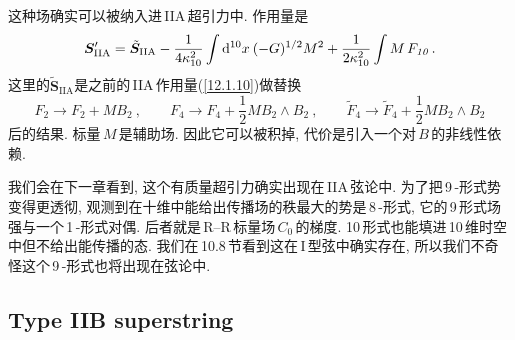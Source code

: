 这种场确实可以被纳入进\,IIA\,超引力中. 作用量是
\begin{equation}
    \bm{S}_{\text{IIA}}^{\prime}=\tilde{\bm{S}}_{\text{IIA}}-\frac{1}{4\kappa_{10}^{2}}\int\mathrm{d}^{10}x\: (-G)^{1/2}M^{2}+\frac{1}{2\kappa_{10}^{2}}\int M\,F_{\textit{10}}\:. \label{12.1.24}
\end{equation}
这里的$\tilde{\bm{S}}_{\text{IIA}}$是之前的\,IIA\,作用量(\ref{12.1.10})做替换
\begin{equation}
    F_{\textit{2}}\to F_{\textit{2}}+MB_{\textit{2}}\:, \qquad 
    F_{\textit{4}}\to F_{\textit{4}}+\frac{1}{2}MB_{\textit{2}}\wedge B_{\textit{2}}\:,\qquad \tilde{F}_{\textit{4}}\to\tilde{F}_{\textit{4}}+\frac{1}{2}MB_{\textit{2}}\wedge B_\textit{2} \label{12.1.25}
\end{equation}
后的结果. 标量$\,M\,$是辅助场. 因此它可以被积掉, 代价是引入一个对$\,B\,$的非线性依赖.

我们会在下一章看到, 这个有质量超引力确实出现在\,IIA\,弦论中. 为了把\,9\,-形式势变得更透彻, 观测到在十维中能给出传播场的秩最大的势是\,8\,-形式, 它的\,9\,形式场强与一个\,1\,-形式对偶. 后者就是\,R--R\,标量场$\,C_{\textit{0}}\,$的梯度. 10\,形式也能填进\,10\,维时空中但不给出能传播的态. 我们在\,10.8\,节看到这在\,I\,型弦中确实存在, 所以我们不奇怪这个\,9\,-形式也将出现在弦论中.


\subsection*{Type IIB superstring}
 
